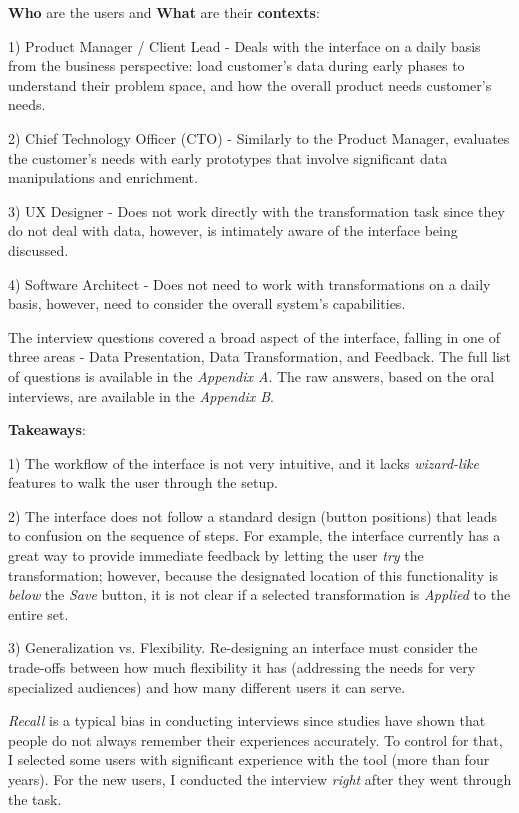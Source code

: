\documentclass[12pt,letterpaper]{article}
\begin{document}
\textbf{Who} are the users and \textbf{What} are their \textbf{contexts}:

1) Product Manager / Client Lead - Deals with the interface on a daily basis from the business perspective: load customer's data during early phases to understand their problem space, and how the overall product needs customer's needs.

2) Chief Technology Officer (CTO) - Similarly to the Product Manager, evaluates the customer's needs with early prototypes that involve significant data manipulations and enrichment.

3) UX Designer - Does not work directly with the transformation task since they do not deal with data, however, is intimately aware of the interface being discussed.   

4) Software Architect - Does not need to work with transformations on a daily basis, however, need to consider the overall system's capabilities.

The interview questions covered a broad aspect of the interface, falling in one of three areas - Data Presentation, Data Transformation, and Feedback. The full list of questions is available in the \textit{Appendix A}. The raw answers, based on the oral interviews, are available in the \textit{Appendix B}. 

\textbf{Takeaways}:

1) The workflow of the interface is not very intuitive, and it lacks \textit{wizard-like} features to walk the user through the setup.

2) The interface does not follow a standard design (button positions) that leads to confusion on the sequence of steps. For example, the interface currently has a great way to provide immediate feedback by letting the user \textit{try} the transformation; however, because the designated location of this functionality is \textit{below} the \textit{Save} button, it is not clear if a selected transformation is \textit{Applied} to the entire set.

3) Generalization vs. Flexibility. Re-designing an interface must consider the trade-offs between how much flexibility it has (addressing the needs for very specialized audiences) and how many different users it can serve.

\bigskip
\textit{Recall} is a typical bias in conducting interviews since studies have shown that people do not always remember their experiences accurately. To control for that, I selected some users with significant experience with the tool (more than four years). For the new users, I conducted the interview \textit{right} after they went through the task.  
\end{document}
